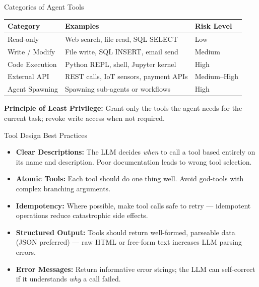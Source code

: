 \documentclass{beamer}       %
\begin{document}
\begin{frame}{Categories of Agent Tools}
    \small
    \begin{table}[]
        \centering
        \begin{tabular}{@{}lll@{}}
            \toprule
            \textbf{Category}     & \textbf{Examples}                       & \textbf{Risk Level} \\ \midrule
            Read-only             & Web search, file read, SQL SELECT       & Low \\
            Write / Modify        & File write, SQL INSERT, email send      & Medium \\
            Code Execution        & Python REPL, shell, Jupyter kernel      & High \\
            External API          & REST calls, IoT sensors, payment APIs   & Medium--High \\
            Agent Spawning        & Spawning sub-agents or workflows        & High \\
            \bottomrule
        \end{tabular}
    \end{table}
    \vspace{0.2cm}
    \textbf{Principle of Least Privilege:} Grant only the tools the agent needs for the current task; revoke write access when not required.
\end{frame}

\begin{frame}{Tool Design Best Practices}
    \begin{itemize}
        \item \textbf{Clear Descriptions:} The LLM decides \emph{when} to call a tool based entirely on its name and description. Poor documentation leads to wrong tool selection.
        \item \textbf{Atomic Tools:} Each tool should do one thing well. Avoid god-tools with complex branching arguments.
        \item \textbf{Idempotency:} Where possible, make tool calls safe to retry --- idempotent operations reduce catastrophic side effects.
        \item \textbf{Structured Output:} Tools should return well-formed, parseable data (JSON preferred) --- raw HTML or free-form text increases LLM parsing errors.
        \item \textbf{Error Messages:} Return informative error strings; the LLM can self-correct if it understands \emph{why} a call failed.
    \end{itemize}
\end{frame}
\end{document}
